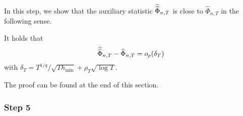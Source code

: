 In this step, we show that the auxiliary statistic $\widehat{\widehat{\Phi}}_{n,T}$ is close to $\widehat{\Phi}_{n,T}$ in the following sense.
\begin{propA}\label{propA:step4}
It holds that 
\[ \widehat{\widehat{\Phi}}_{n,T} - \widehat{\Phi}_{n,T} = o_p(\delta_T) \]
with $\delta_T = T^{1/q}/\sqrt{T h_{\min}} + \rho_T \sqrt{\log T}$.
\end{propA}
The proof can be found at the end of this section. 


\subsubsection*{Step 5} 


